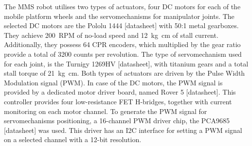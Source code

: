 The MMS robot utilises two types of actuators, four DC motors for each of the mobile platform wheels and the servomechanisms for manipulator joints. The selected DC motors are the Pololu 1444 [datasheet] with 50:1 metal gearboxes. They achieve \SI{200}{RPM} of no-load speed and \SI{12}{\kilogram \centi\metre} of stall current. Additionally, they possess 64 CPR encoders, which multiplied by the gear ratio provide a total of 3200 counts per revolution. The type of servomechanism used for each joint, is the Turnigy 1269HV [datasheet], with titanium gears and a total stall torque of \SI{21}{\kilogram \centi\metre}. Both types of actuators are driven by the Pulse Width Modulation signal (PWM). In case of the DC motors, the PWM signal is provided by a dedicated motor driver board, named Rover 5 [datasheet]. This controller provides four low-resistance FET H-bridges, together with current monitoring on each motor channel. To generate the PWM signal for servomechanisms positioning, a 16-channel PWM driver chip, the PCA9685 [datasheet] was used. This driver has an I2C interface for setting a PWM signal on a selected channel with a 12-bit resolution.



